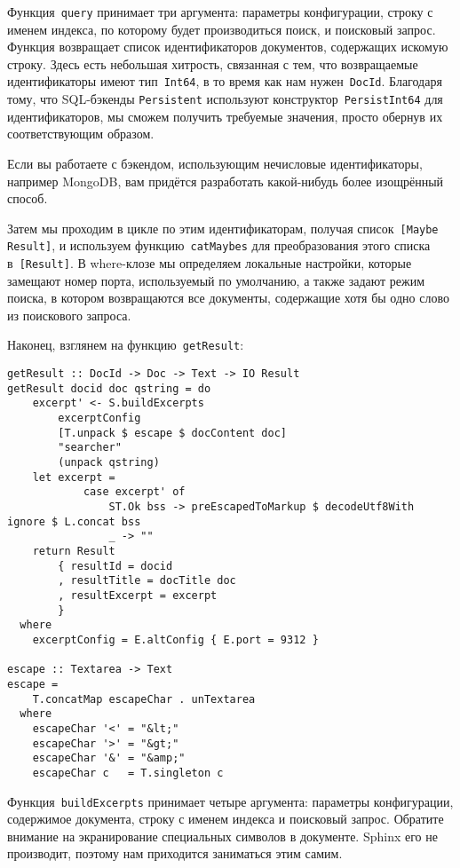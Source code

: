 Функция~\lstinline'query' принимает три аргумента: параметры конфигурации, строку с именем индекса, по которому будет производиться поиск, и поисковый запрос. Функция возвращает список идентификаторов документов, содержащих искомую строку. Здесь есть небольшая хитрость, связанная с тем, что возвращаемые идентификаторы имеют тип~\lstinline'Int64', в то время как нам нужен~\lstinline'DocId'. Благодаря тому, что SQL-бэкенды \lstinline'Persistent' используют конструктор~\lstinline'PersistInt64' для идентификаторов, мы сможем получить требуемые значения, просто обернув их соответствующим образом.

\begin{remark}
Если вы работаете с бэкендом, использующим нечисловые идентификаторы, например MongoDB, вам придётся разработать какой-нибудь более изощрённый способ.
\end{remark}

Затем мы проходим в цикле по этим идентификаторам, получая список~\lstinline'[Maybe Result]', и используем функцию~\lstinline'catMaybes' для преобразования этого списка в~\lstinline'[Result]'. В where-клозе мы определяем локальные настройки, которые замещают номер порта, используемый по умолчанию, а также задают режим поиска, в котором возвращаются все документы, содержащие хотя бы одно слово из поискового запроса.

Наконец, взглянем на функцию~\lstinline'getResult':
\begin{lstlisting}
getResult :: DocId -> Doc -> Text -> IO Result
getResult docid doc qstring = do
    excerpt' <- S.buildExcerpts
        excerptConfig
        [T.unpack $ escape $ docContent doc]
        "searcher"
        (unpack qstring)
    let excerpt =
            case excerpt' of
                ST.Ok bss -> preEscapedToMarkup $ decodeUtf8With ignore $ L.concat bss
                _ -> ""
    return Result
        { resultId = docid
        , resultTitle = docTitle doc
        , resultExcerpt = excerpt
        }
  where
    excerptConfig = E.altConfig { E.port = 9312 }

escape :: Textarea -> Text
escape =
    T.concatMap escapeChar . unTextarea
  where
    escapeChar '<' = "&lt;"
    escapeChar '>' = "&gt;"
    escapeChar '&' = "&amp;"
    escapeChar c   = T.singleton c
\end{lstlisting}

Функция~\lstinline'buildExcerpts' принимает четыре аргумента: параметры конфигурации, содержимое документа, строку с именем индекса и поисковый запрос. Обратите внимание на экранирование специальных символов в документе. Sphinx его не производит, поэтому нам приходится заниматься этим самим.

